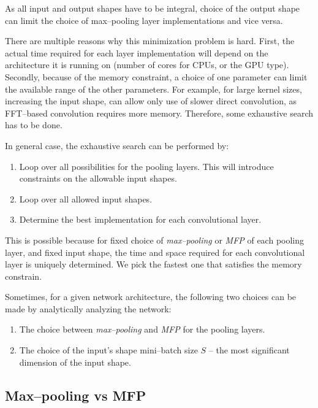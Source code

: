 \documentclass[conference]{IEEEtran}
\begin{document}
  As all input and output shapes have to be integral, choice of the
  output shape can limit the choice of max--pooling layer
  implementations and vice versa.

  There are multiple reasons why this minimization problem is hard.
  First, the actual time required for each layer implementation will
  depend on the architecture it is running on (number of cores for
  CPUs, or the GPU type).  Secondly, because of the memory constraint,
  a choice of one parameter can limit the available range of the other
  parameters.  For example, for large kernel sizes, increasing the
  input shape, can allow only use of slower direct convolution, as
  FFT--based convolution requires more memory.  Therefore, some
  exhaustive search has to be done.

  In general case, the exhaustive search can be performed by:

  \begin{enumerate}
    \item Loop over all possibilities for the pooling layers.  This
      will introduce constraints on the allowable input shapes.
    \item Loop over all allowed input shapes.
    \item Determine the best implementation for each convolutional
      layer.
  \end{enumerate}

  This is possible because for fixed choice of \emph{max--pooling} or
  \emph{MFP} of each pooling layer, and fixed input shape, the time
  and space required for each convolutional layer is uniquely
  determined.  We pick the fastest one that satisfies the memory
  constrain.

  Sometimes, for a given network architecture, the following two
  choices can be made by analytically analyzing the network:

  \begin{enumerate}
    \item The choice between \emph{max--pooling} and \emph{MFP} for
      the pooling layers.
    \item The choice of the input's shape mini--batch size $S$ -- the
      most significant dimension of the input shape.
  \end{enumerate}

\subsection{Max--pooling vs MFP}
\end{document}
